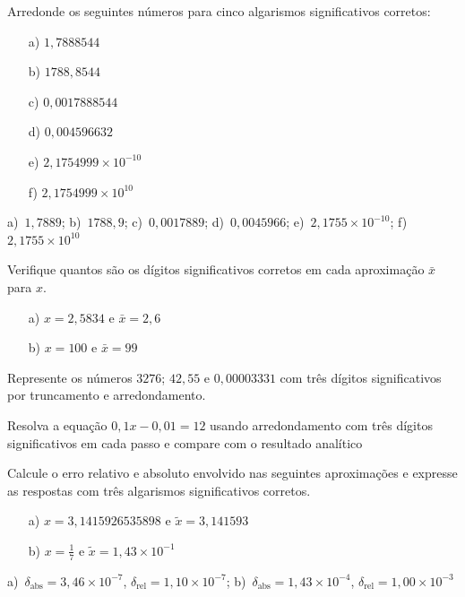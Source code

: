 \documentclass[main.tex]{subfiles}
\begin{document}
\begin{Exercise} Arredonde os seguintes números para cinco algarismos significativos corretos:
  \begin{multicols}{3}
    \begin{itemize}
    \item [a)] $1,7888544$
    \item [b)] $1788,8544$
    \item [c)] $0,0017888544$
    \item [d)] $0,004596632$
    \item [e)] $ 2,1754999\times 10^{-10}$
    \item [f)] $ 2,1754999\times 10^{10}$
    \end{itemize}
  \end{multicols}
\end{Exercise}
\begin{Answer}
  \begin{tiny}
a)~$1,7889$; b)~$1788,9$; c)~$0,0017889$; d)~$0,0045966$; e)~$2,1755\times 10^{-10}$; f)~$2,1755\times 10^{10}$    
  \end{tiny}
\end{Answer}

\begin{Exercise}
Verifique quantos são os dígitos significativos corretos em cada aproximação $\bar{x}$ para $x$.
\begin{itemize}
\item[a)] $x=2,5834$ e $\bar{x}=2,6$
\item[b)] $x=100$ e $\bar{x}=99$
\end{itemize}
\end{Exercise}

\begin{Exercise}  Represente os números $3276$; $42,55$ e $0,00003331$ com três dígitos significativos por truncamento e arredondamento.
\end{Exercise}

\begin{Exercise} Resolva a equação $0,1x-0,01=12$ usando arredondamento com três dígitos significativos em cada passo e compare com o resultado analítico
\end{Exercise}


\begin{Exercise} Calcule o erro relativo e absoluto envolvido nas seguintes aproximações e expresse as respostas com três algarismos significativos corretos.
    \begin{itemize}
    \item [a)] $x=3,1415926535898$ e $\tilde{x}=3,141593$
    \item [b)] $x=\frac{1}{7}$ e $\tilde{x}=1,43\times 10^{-1}$
    \end{itemize}
\end{Exercise}
\begin{Answer}
  \begin{tiny}
    a)~$\delta_{\mbox{abs}}=3,46\times 10^{-7}$, $\delta_{\mbox{rel}}=1,10\times 10^{-7}$; b)~$\delta_{\mbox{abs}}=1,43\times 10^{-4}$, $\delta_{\mbox{rel}} = 1,00 \times 10^{-3}$
  \end{tiny}
\end{Answer}
\end{document}
